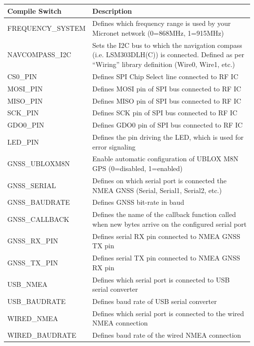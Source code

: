\documentclass{report}
\begin{document}
\begin{table}[h]
	\begin{tabular}{|l|p{12cm}|}
		\hline
		\textbf{Compile Switch} & \textbf{Description}\\
		\hline
		FREQUENCY\_SYSTEM & Defines which frequency range is used by your Micronet network (0=868MHz, 1=915MHz)\\
		\hline
		NAVCOMPASS\_I2C & Sets the I2C bus to which the navigation compass (i.e. LSM303DLH(C)) is connected. Defined as per “Wiring” library definition (Wire0, Wire1, etc.)\\
		\hline
		CS0\_PIN & Defines SPI Chip Select line connected to RF IC\\
		\hline
		MOSI\_PIN & Defines MOSI pin of SPI bus connected to RF IC\\
		\hline
		MISO\_PIN & Defines MISO pin of SPI bus connected to RF IC\\
		\hline
		SCK\_PIN & Defines SCK pin of SPI bus connected to RF IC\\
		\hline
		GDO0\_PIN & Defines GDO0 pin of SPI bus connected to RF IC\\
		\hline
		LED\_PIN & Defines the pin driving the LED, which is used for error signaling\\
		\hline
		GNSS\_UBLOXM8N & Enable automatic configuration of UBLOX M8N GPS (0=disabled, 1=enabled)\\
		\hline
		GNSS\_SERIAL & Defines on which serial port is connected the NMEA GNSS (Serial, Serial1, Serial2, etc.)\\
		\hline
		GNSS\_BAUDRATE & Defines GNSS bit-rate in baud\\
		\hline
		GNSS\_CALLBACK & Defines the name of the callback function called when new bytes arrive on the
		configured serial port\\
		\hline
		GNSS\_RX\_PIN & Defines serial RX pin connected to NMEA GNSS TX pin\\
		\hline
		GNSS\_TX\_PIN & Defines serial TX pin connected to NMEA GNSS RX pin\\
		\hline
		USB\_NMEA & Defines which serial port is connected to USB serial converter\\
		\hline
		USB\_BAUDRATE & Defines baud rate of USB serial converter\\
		\hline
		WIRED\_NMEA & Defines which serial port is connected to the wired NMEA connection\\
		\hline
		WIRED\_BAUDRATE & Defines baud rate of the wired NMEA connection\\
		\hline

\end{tabular}
\end{table}
\end{document}
